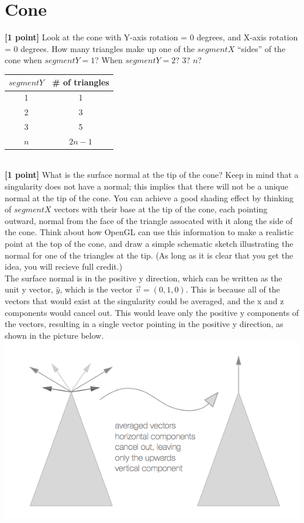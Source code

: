 \documentclass[10pt,twocolumn]{article}
\begin{document}
\section{Cone}
{\bf [1 point]} Look at the cone with Y-axis rotation = 0 degrees, and X-axis rotation = 0 degrees. How many triangles make up one of the $segmentX$ ``sides'' of the cone when $segmentY=1$? When $segmentY=2$? 3? $n$? 
\begin{tabular}{c|c}
$segmentY$ & \# of triangles \\ \hline
1 & 1 \\
2 & 3 \\
3 & 5 \\
$n$ & $2n - 1$
\end{tabular}
\vspace{2em}\\
{\bf [1 point]} What is the surface normal at the tip of the cone? Keep in mind that a singularity does not have a normal; this implies that there will not be a unique normal at the tip of the cone. You can achieve a good shading effect by thinking of $segmentX$ vectors with their base at the tip of the cone, each pointing outward, normal from the face of the triangle assocated with it along the side of the cone. Think about how OpenGL can use this information to make a realistic point at the top of the cone, and draw a simple schematic sketch illustrating the normal for one of the triangles at the tip. (As long as it is clear that you get the idea, you will recieve full credit.)
\vspace{2em}\\
The surface normal is in the positive y direction, which can be written as the unit y vector, $\hat{y}$, which is the vector $\vec{v} = (0,1,0)$. This is because all of the vectors that would exist at the singularity could be averaged, and the x and z components would cancel out. This would leave only the positive y components of the vectors, resulting in a single vector pointing in the positive y direction, as shown in the picture below.
\includegraphics[scale=0.4]{graphicshw1cone} \\
\end{document}

